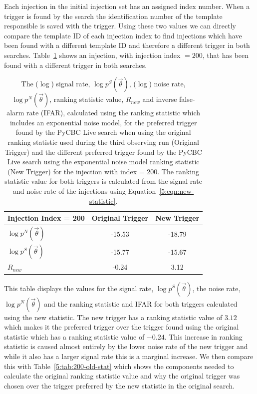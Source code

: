 Each injection in the initial injection set has an assigned index number. When a trigger is found by the search the identification number of the template responsible is saved with the trigger. Using these two values we can directly compare the template ID of each injection index to find injections which have been found with a different template ID and therefore a different trigger in both searches. Table~\ref{5:tab:200-new-stat} shows an injection, with injection index $= 200$, that has been found with a different trigger in both searches.
%
\begin{table}[ht]
    \centering
    \begin{tabular}{lcc}
        \toprule
        \textbf{Injection Index = 200} & \textbf{Original Trigger} & \textbf{New Trigger} \\
        \midrule
        $\log p^{N}(\Vec{\theta})$  & -15.53 & -18.79 \\
        $\log p^{S}(\Vec{\theta})$ & -15.77 & -15.67 \\
        $R_{new}$ & -0.24 & 3.12 \\
        \bottomrule
    \end{tabular}
    \caption{The ($\log$) signal rate, $\log p^{S}(\Vec{\theta})$, ($\log$) noise rate, $\log p^{N}(\Vec{\theta})$, ranking statistic value, $R_{new}$ and inverse false-alarm rate (IFAR), calculated using the ranking statistic which includes an exponential noise model, for the preferred trigger found by the PyCBC Live search when using the original ranking statistic used during the third observing run (Original Trigger) and the different preferred trigger found by the PyCBC Live search using the exponential noise model ranking statistic (New Trigger) for the injection with index = 200. The ranking statistic value for both triggers is calculated from the signal rate and noise rate of the injections using Equation~\ref{5:eqn:new-statistic}.}

    \label{5:tab:200-new-stat}
\end{table}
%
This table displays the values for the signal rate, $\log p^{S}(\Vec{\theta})$, the noise rate, $\log p^{N}(\Vec{\theta})$ and the ranking statistic and IFAR for both triggers calculated using the new statistic. The new trigger has a ranking statistic value of $3.12$ which makes it the preferred trigger over the trigger found using the original statistic which has a ranking statistic value of $-0.24$. This increase in ranking statistic is caused almost entirely by the lower noise rate of the new trigger and while it also has a larger signal rate this is a marginal increase. We then compare this with Table~\ref{5:tab:200-old-stat} which shows the components needed to calculate the original ranking statistic value and why the original trigger was chosen over the trigger preferred by the new statistic in the original search.

